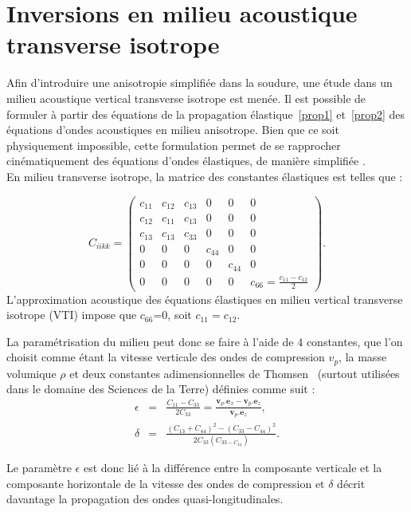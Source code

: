 \section{Inversions en milieu acoustique transverse isotrope}
Afin d'introduire une anisotropie simplifiée dans la soudure, une étude dans un milieu acoustique vertical transverse isotrope est menée.
Il est possible de formuler à partir des équations de la propagation élastique~\ref{prop1} et~\ref{prop2} des équations d'ondes acoustiques en milieu anisotrope. Bien que ce soit physiquement impossible, cette formulation permet de se rapprocher cinématiquement des équations d'ondes élastiques, de manière simplifiée \citep{alkhalifah}.\\
En milieu transverse isotrope, la matrice des constantes élastiques est telles que  : 

\begin{equation}
	C_{iikk} = \begin{pmatrix}
		c_{11} & c_{12} & c_{13} & 0 & 0 & 0 \\
		c_{12} & c_{11} & c_{13} & 0 & 0 & 0 \\
		c_{13} & c_{13} & c_{33} & 0 & 0 & 0 \\
		0 & 0 & 0 & c_{44} & 0 & 0 \\
		0 & 0 & 0 & 0 &c_{44} & 0 \\
		0 & 0 & 0 & 0 & 0 & c_{66} = \frac{c_{11}-c_{12}}{2}
	\end{pmatrix}.
\end{equation}
L'approximation acoustique des équations élastiques en milieu vertical transverse isotrope (VTI) impose que $c_{66}$=0, soit $c_{11}=c_{12}$.
 

La paramétrisation du milieu peut donc se faire à l'aide de 4 constantes, que l'on choisit comme étant la vitesse verticale des ondes de compression $v_{p}$, la masse volumique $\rho$ et deux constantes adimensionnelles de Thomsen~\citep{thomsen} (surtout utilisées dans le domaine des Sciences de la Terre) définies comme suit : 
\begin{eqnarray}
	\epsilon & =  & \frac{C_{11}-C_{33}}{2C_{33}} = \frac{\bm{v}_{p}.\bm{e}_{x} -  \bm{v}_{p}.\bm{e}_{z}}{\bm{v}_{p}.\bm{e}_{z}},\\
	\delta & = & \frac{(C_{13}+C_{44})^2-(C_{33}-C_{44})^2}{2C_{33}(C_{33-C_{44}})}\text{.}
\end{eqnarray}

Le paramètre $\epsilon$ est donc lié à la différence entre la composante verticale et la composante horizontale de la vitesse des ondes de compression et $\delta$ décrit davantage la propagation des ondes quasi-longitudinales.\\

